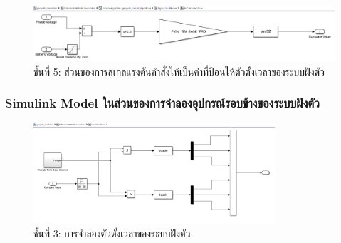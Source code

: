\documentclass[11pt,a4paper]{article}
\begin{document}
\begin{figure}[H]
    \centering
    \includegraphics[width=\textwidth]{l5-to-cmp.png}
    \caption{ชั้นที่ 5: ส่วนของการสเกลแรงดันคำสั่งให้เป็นค่าที่ป้อนให้ตัวตั้งเวลาของระบบฝังตัว}
\end{figure}

\subsubsection{Simulink Model ในส่วนของการจำลองอุปกรณ์รอบข้างของระบบฝังตัว}

\begin{figure}[H]
    \centering
    \includegraphics[width=0.8\textwidth]{l3-sim-tim.png}
    \caption{ชั้นที่ 3: การจำลองตัวตั้งเวลาของระบบฝังตัว}
\end{figure}
\end{document}
